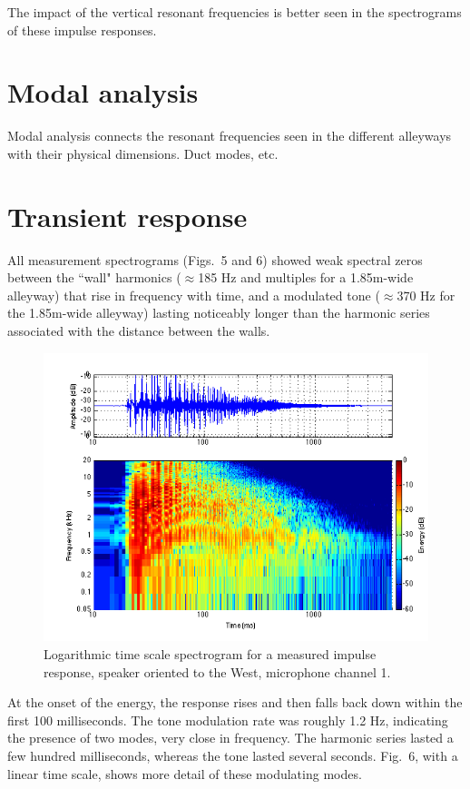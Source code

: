\documentclass{aes137}
\begin{document}
The impact of the vertical resonant frequencies is better seen in the spectrograms of these impulse responses. %

\section{Modal analysis}
Modal analysis connects the resonant frequencies seen in the different alleyways with their physical dimensions. Duct modes, etc.

\section{Transient response}
All measurement spectrograms (Figs.~5 and 6) showed weak spectral zeros between the ``wall" harmonics ($\approx$185 Hz and multiples for a 1.85m-wide alleyway) that rise in frequency with time, and a modulated tone ($\approx$370 Hz for the 1.85m-wide alleyway) lasting noticeably longer than the harmonic series associated with the distance between the walls. 

\begin{figure}[h] \centering \includegraphics[width=\linewidth, trim=10mm 5mm 2mm 7mm, clip]{images/logspectrogram.png} \caption{Logarithmic time scale spectrogram for a measured impulse response, speaker oriented to the West, microphone channel 1.} \end{figure}

At the onset of the energy, the response rises and then falls back down within the first 100 milliseconds. The tone modulation rate was roughly 1.2 Hz, indicating the presence of two modes, very close in frequency. The harmonic series lasted a few hundred milliseconds, whereas the tone lasted several seconds. Fig.~6, with a linear time scale, shows more detail of these modulating modes.
\end{document}
